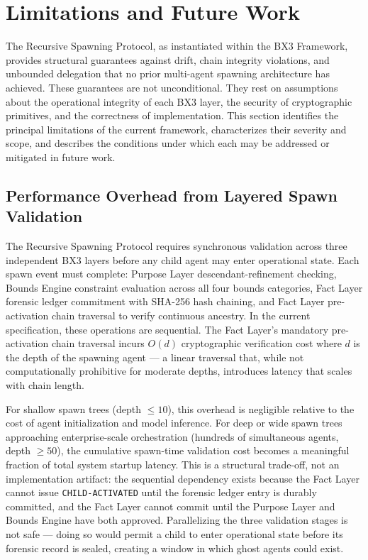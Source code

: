 
\section{Limitations and Future Work}
\label{sec:limitations}

The Recursive Spawning Protocol, as instantiated within the BX3 Framework, provides structural guarantees against drift, chain integrity violations, and unbounded delegation that no prior multi-agent spawning architecture has achieved. These guarantees are not unconditional. They rest on assumptions about the operational integrity of each BX3 layer, the security of cryptographic primitives, and the correctness of implementation. This section identifies the principal limitations of the current framework, characterizes their severity and scope, and describes the conditions under which each may be addressed or mitigated in future work.

\subsection{Performance Overhead from Layered Spawn Validation}

The Recursive Spawning Protocol requires synchronous validation across three independent BX3 layers before any child agent may enter operational state. Each spawn event must complete: Purpose Layer descendant-refinement checking, Bounds Engine constraint evaluation across all four bounds categories, Fact Layer forensic ledger commitment with SHA-256 hash chaining, and Fact Layer pre-activation chain traversal to verify continuous ancestry. In the current specification, these operations are sequential. The Fact Layer's mandatory pre-activation chain traversal incurs $O(d)$ cryptographic verification cost where $d$ is the depth of the spawning agent — a linear traversal that, while not computationally prohibitive for moderate depths, introduces latency that scales with chain length.

For shallow spawn trees (depth $\leq 10$), this overhead is negligible relative to the cost of agent initialization and model inference. For deep or wide spawn trees approaching enterprise-scale orchestration (hundreds of simultaneous agents, depth $\geq 50$), the cumulative spawn-time validation cost becomes a meaningful fraction of total system startup latency. This is a structural trade-off, not an implementation artifact: the sequential dependency exists because the Fact Layer cannot issue \texttt{CHILD-ACTIVATED} until the forensic ledger entry is durably committed, and the Fact Layer cannot commit until the Purpose Layer and Bounds Engine have both approved. Parallelizing the three validation stages is not safe — doing so would permit a child to enter operational state before its forensic record is sealed, creating a window in which ghost agents could exist.

